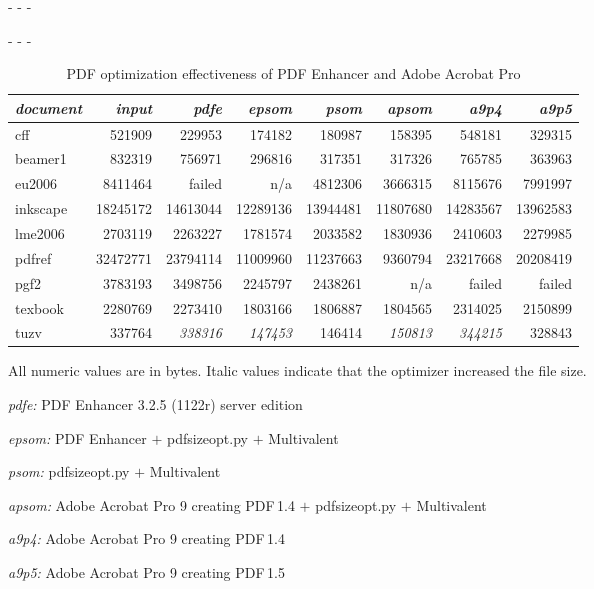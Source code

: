 \documentclass{ltugproc}
\def\cmd{\textsf}
\def\captiontop#1{%
  \advance\abovecaptionskip-\belowcaptionskip
  \advance\belowcaptionskip\abovecaptionskip
  \advance\abovecaptionskip-\belowcaptionskip
  \abovecaptionskip-\abovecaptionskip
  \caption{#1}%
  \advance\abovecaptionskip-\belowcaptionskip
  \advance\belowcaptionskip\abovecaptionskip
  \advance\abovecaptionskip-\belowcaptionskip
  \abovecaptionskip-\abovecaptionskip
}
\begin{document}
\begin{table*}
\captiontop{PDF optimization effectiveness
of PDF Enhancer and Adobe Acrobat Pro}\label{tab:eff-pdfe-a9}
\par\small\noindent\hfil
\advance\tabcolsep-2pt  %
\begin{tabular*}{\hsize}{@{\extracolsep{\fill}}lrrrrrrr@{}}
\toprule
\emph{document} & \emph{input} & \emph{pdfe} & \emph{epsom} & \emph{psom} & \emph{apsom} & \emph{a9p4} & \emph{a9p5} \\\midrule
cff         &   521909 &   229953 &   174182 &   180987 &   158395 &   548181 &   329315\\
beamer1     &   832319 &   756971 &   296816 &   317351 &   317326 &   765785 &   363963\\
eu2006      &  8411464 &  failed  & n/a      &  4812306 &  3666315 &  8115676 &  7991997\\
inkscape    & 18245172 & 14613044 & 12289136 & 13944481 & 11807680 & 14283567 & 13962583\\
lme2006     &  2703119 &  2263227 &  1781574 &  2033582 &  1830936 &  2410603 &  2279985\\
pdfref      & 32472771 & 23794114 & 11009960 & 11237663 &  9360794 & 23217668 & 20208419\\
pgf2        &  3783193 &  3498756 &  2245797 &  2438261 & n/a      &   failed &   failed\\
texbook     &  2280769 &  2273410 &  1803166 &  1806887 &  1804565 &  2314025 &  2150899\\
tuzv        &   337764 &  \emph{338316} &   \emph{147453} & 146414 & \emph{150813} &  \emph{344215} &   328843 \\
\bottomrule
\end{tabular*}
\par\bigskip
\par\noindent All numeric values are in bytes.
Italic values indicate that the optimizer increased the file size.
\par\noindent\emph{pdfe:} PDF Enhancer 3.2.5 (1122r) server edition
\par\noindent\emph{epsom:} PDF Enhancer $+$ \cmd{pdfsizeopt.py} $+$ Multivalent
\par\noindent\emph{psom:} \cmd{pdfsizeopt.py} $+$ Multivalent
\par\noindent\emph{apsom:} Adobe Acrobat Pro 9 creating PDF\,1.4 $+$ \cmd{pdfsizeopt.py} $+$ Multivalent
\par\noindent\emph{a9p4:} Adobe Acrobat Pro 9 creating PDF\,1.4
\par\noindent\emph{a9p5:} Adobe Acrobat Pro 9 creating PDF\,1.5
\end{table*}
\end{document}
